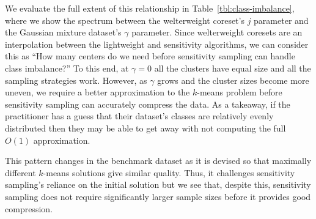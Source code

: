 We evaluate the full extent of this relationship in Table~\ref{tbl:class-imbalance}, where we show the spectrum between the welterweight coreset's $j$ parameter
and the Gaussian mixture dataset's $\gamma$ parameter. Since welterweight coresets are an interpolation between the lightweight and sensitivity algorithms, we
can consider this as ``How many centers do we need before sensitivity sampling can handle class imbalance?'' To this end, at $\gamma = 0$ all the clusters have
equal size and all the sampling strategies work. However, as $\gamma$ grows and the cluster sizes become more uneven, we require a better approximation to the
$k$-means problem before sensitivity sampling can accurately compress the data. As a takeaway, if the practitioner has a guess that their dataset's classes are
relatively evenly distributed then they may be able to get away with not computing the full $O(1)$ approximation.

This pattern changes in the benchmark dataset as it is devised so that maximally different $k$-means solutions give similar quality. Thus, it challenges
sensitivity sampling's reliance on the initial solution but we see that, despite this, sensitivity sampling does not require significantly larger sample sizes
before it provides good compression.

